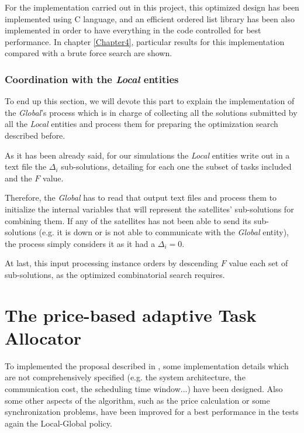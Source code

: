 For the implementation carried out in this project, this optimized design has been implemented using C language, and an efficient ordered list library has been also implemented in order to have everything in the code controlled for best performance. In chapter \ref{Chapter4}, particular results for this implementation compared with a brute force search are shown.

\subsubsection{Coordination with the \emph{Local} entities}

To end up this section, we will devote this part to explain the implementation of the \emph{Global}'s process which is in charge of collecting all the solutions submitted by all the \emph{Local} entities and process them for preparing the optimization search described before.

As it has been already said, for our simulations the \emph{Local} entities write out in a text file the $\Delta_i$ sub-solutions, detailing for each one the subset of tasks included and the $F$ value.

Therefore, the \emph{Global} has to read that output text files and process them to initialize the internal variables that will represent the satellites' sub-solutions for combining them. If any of the satellites has not been able to send its sub-solutions (e.g. it is down or is not able to communicate with the \emph{Global} entity), the process simply considers it as it had a $\Delta_i = 0$.

At last, this input processing instance orders by descending $F$ value each set of sub-solutions, as the optimized combinatorial search requires.


\section{The price-based adaptive Task Allocator}
\label{MBimplementation}

To implemented the proposal described in \cite{Edalat09}, some implementation details which are not comprehensively specified (e.g. the system architecture, the communication cost, the scheduling time window...) have been designed. Also some other aspects of the algorithm, such as the price calculation or some synchronization problems, have been improved for a best performance in the tests again the Local-Global policy.

